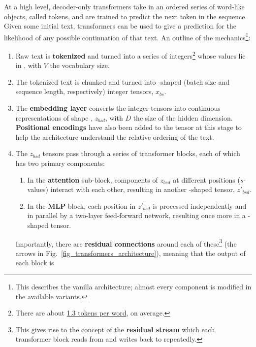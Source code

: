 At a high level, decoder-only transformers take in an ordered series of word-like objects, called
tokens, and are trained to predict the next token in the sequence. Given some initial
text, transformers can be used to give a prediction for the likelihood of any possible continuation
of that text. An outline of the mechanics\footnote{This describes the vanilla architecture; almost
every component is modified in the available variants.}:
\begin{enumerate}
	\item Raw text is \textbf{tokenized} and turned into a series of integers\footnote{There are
		      about \href{https://github.com/ray-project/llm-numbers}{1.3 tokens per word}, on average.} whose values lie in , with $ V $ the vocabulary
	      size.
	\item The tokenized text is chunked and turned into -shaped (batch size and
	      sequence length, respectively) integer tensors, $ x _{ bs } $.
	\item The \textbf{embedding layer} converts the integer tensors into continuous representations of shape
	      , $ z _{ bsd } $, with $ D $ the size of the hidden dimension.
	      \textbf{Positional encodings} have also been added to the tensor at this stage to help the
	      architecture understand the relative ordering of the text.
	\item The $ z _{ bsd } $ tensors pass through a series of transformer blocks, each of which has
	      two primary components:
	      \begin{enumerate}
		      \item In the \textbf{attention} sub-block, components of $ z _{ bsd } $ at different
		            positions ($ s $-values) interact with each other, resulting in another -shaped
		            tensor, $  z' _{ bsd } $.
		      \item In the \textbf{MLP} block, each position in  $ z' _{ bsd } $ is processed
		            independently and in parallel by a two-layer feed-forward network, resulting once more
		            in a -shaped tensor.
	      \end{enumerate}
	      Importantly, there are \textbf{residual connections} around each of these\footnote{This
		      gives rise to the concept of the \textbf{residual stream} which each transformer block reads
              from and writes back to repeatedly.} (the arrows in
              Fig.~\ref{fig_transformers_architecture}), meaning that the output of each block is

\end{enumerate}

